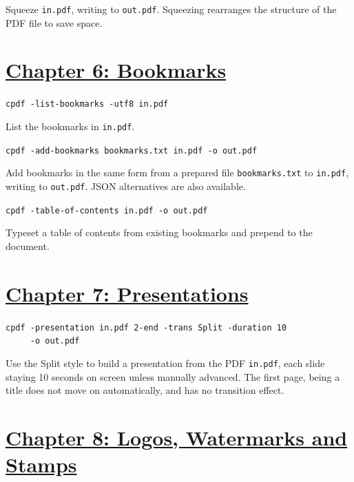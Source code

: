\documentclass{book}
\begin{document}
\noindent Squeeze \texttt{in.pdf}, writing to \texttt{out.pdf}. Squeezing rearranges the structure of the PDF file to save space.


\section*{\hyperref[chap:6]{Chapter 6: Bookmarks}}

\begin{framed}\noindent\texttt{cpdf -list-bookmarks -utf8 in.pdf}\end{framed}

\noindent List the bookmarks in \texttt{in.pdf}. 

\begin{framed}\noindent\texttt{cpdf -add-bookmarks bookmarks.txt in.pdf -o out.pdf}\end{framed}

\noindent Add bookmarks in the same form from a prepared file \texttt{bookmarks.txt} to \texttt{in.pdf}, writing to \texttt{out.pdf}. JSON alternatives are also available.

\begin{framed}\noindent\texttt{cpdf -table-of-contents in.pdf -o out.pdf}\end{framed}

\noindent Typeset a table of contents from existing bookmarks and prepend to the document.

\section*{\hyperref[chap:7]{Chapter 7: Presentations}}

\begin{framed}
 \noindent\small\verb?cpdf -presentation in.pdf 2-end -trans Split -duration 10?\\
 \noindent\small\verb?     -o out.pdf?
\end{framed}

\noindent Use the Split style to build a presentation from the PDF \texttt{in.pdf}, each slide staying 10 seconds on screen unless manually advanced. The first page, being a title does not move on automatically, and has no transition effect.

\section*{\hyperref[chap:8]{Chapter 8: Logos, Watermarks and Stamps}}
\end{document}
